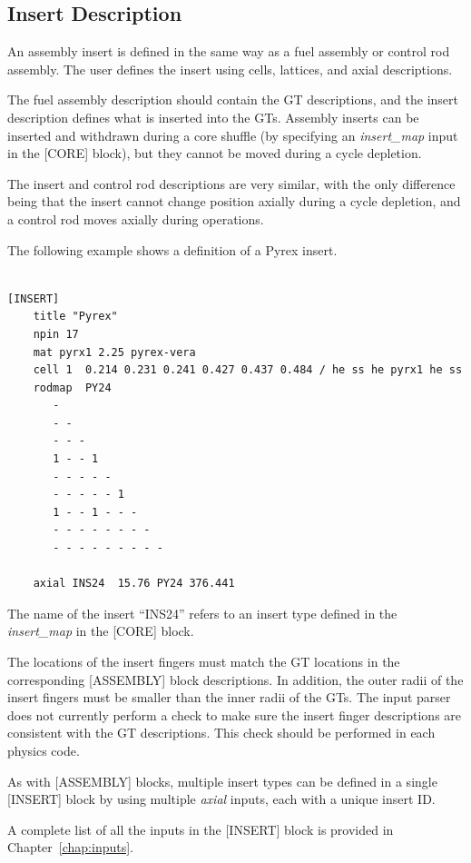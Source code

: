 \subsection{Insert Description}
An assembly insert is defined in the same way as a fuel assembly or control rod assembly.
The user defines the insert using cells, lattices, and axial descriptions.

The fuel assembly description should contain the GT descriptions, and the insert description
defines what is inserted into the GTs. Assembly inserts can be inserted and withdrawn
during a core shuffle (by specifying an {\it insert\_map} input in the [CORE] block),
but they cannot be moved during a cycle depletion.

The insert and control rod descriptions are very similar, with the only difference being that the
insert cannot change position axially during a cycle depletion, and a control rod moves axially
during operations.

The following example shows a definition of a Pyrex insert.

\begin{Verbatim}[fontsize=\small]

[INSERT]
    title "Pyrex"
    npin 17
    mat pyrx1 2.25 pyrex-vera
    cell 1  0.214 0.231 0.241 0.427 0.437 0.484 / he ss he pyrx1 he ss
    rodmap  PY24
       -
       - -
       - - -
       1 - - 1
       - - - - -
       - - - - - 1
       1 - - 1 - - -
       - - - - - - - -
       - - - - - - - - -

    axial INS24  15.76 PY24 376.441

\end{Verbatim}

The name of the insert ``INS24'' refers to an insert type defined in the
{\it insert\_map} in the [CORE] block.

The locations of the insert fingers must match the GT locations in the
corresponding [ASSEMBLY] block descriptions.  In addition, the outer radii of the insert
fingers must be smaller than the inner radii of the GTs.
The input parser does not currently perform a check to make sure the insert finger
descriptions are consistent with the GT descriptions.
This check should be performed in each physics code.

As with [ASSEMBLY] blocks, multiple insert types can be defined in a single [INSERT]
block by using multiple {\it axial} inputs, each with a unique insert ID.

A complete list of all the inputs in the [INSERT] block is provided in Chapter~\ref{chap:inputs}.

